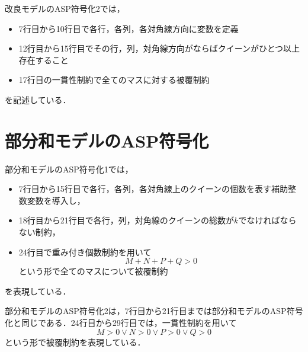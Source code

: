 \newpage
改良モデルのASP符号化2では，
\begin{itemize}
 \item 7行目から10行目で各行，各列，各対角線方向に変数を定義
 \item 12行目から15行目でその行，列，対角線方向がならばクイーンがひとつ以上存在すること
 \item 17行目の一貫性制約で全てのマスに対する被覆制約
\end{itemize}
を記述している．
\newpage
\section{部分和モデルのASP符号化}



部分和モデルのASP符号化1では，
\begin{itemize}
 \item 7行目から15行目で各行，各列，各対角線上のクイーンの個数を表す補助整数変数を導入し，
 \item 18行目から21行目で各行，列，対角線のクイーンの総数が$k$でなければならない制約， 
 \item 24行目で重み付き個数制約を用いて\[
													  M+N+P+Q>0   
													 \]
という形で全てのマスについて被覆制約
\end{itemize}
を表現している．



\newpage
部分和モデルのASP符号化2は，7行目から21行目までは部分和モデルのASP符号化と同じである．24行目から29行目では，一貫性制約を用いて\[
												 M>0 \vee N>0 \vee P>0 \vee Q>0
												  \]
という形で被覆制約を表現している．

